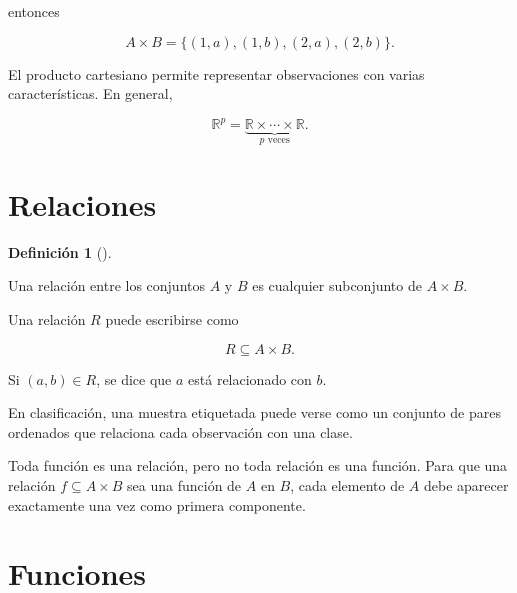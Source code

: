 \documentclass[
  spanish,
  10.5pt,
  letterpaper,
  DIV=11,
  numbers=noendperiod,
  oneside,
  open=any]{scrreprt}
\theoremstyle{definition}
\newtheorem{definition}{Definición}[chapter]
\theoremstyle{definition}
\theoremstyle{plain}
\theoremstyle{remark}
\begin{document}
entonces

\[
A\times B
=
\{(1,a),(1,b),(2,a),(2,b)\}.
\]

El producto cartesiano permite representar observaciones con varias
características. En general,

\[
\mathbb{R}^{p}
=
\underbrace{
\mathbb{R}\times\cdots\times\mathbb{R}
}_{p\text{ veces}}.
\]

\section*{Relaciones}\label{relaciones}


\begin{definition}[]\protect\hypertarget{def-relacion}{}\label{def-relacion}

Una relación entre los conjuntos \(A\) y \(B\) es cualquier subconjunto
de \(A\times B\).

\end{definition}

Una relación \(R\) puede escribirse como

\[
R\subseteq A\times B.
\]

Si \((a,b)\in R\), se dice que \(a\) está relacionado con \(b\).

En clasificación, una muestra etiquetada puede verse como un conjunto de
pares ordenados que relaciona cada observación con una clase.

\begin{tcolorbox}[enhanced jigsaw, arc=.35mm, bottomrule=.15mm, bottomtitle=1mm, breakable, colback=white, colbacktitle=quarto-callout-note-color!10!white, colframe=quarto-callout-note-color-frame, coltitle=black, left=2mm, leftrule=.75mm, opacityback=0, opacitybacktitle=0.6, rightrule=.15mm, title=\textcolor{quarto-callout-note-color}{\faInfo}\hspace{0.5em}{Relación y función}, titlerule=0mm, toprule=.15mm, toptitle=1mm]

Toda función es una relación, pero no toda relación es una función. Para
que una relación \(f\subseteq A\times B\) sea una función de \(A\) en
\(B\), cada elemento de \(A\) debe aparecer exactamente una vez como
primera componente.

\end{tcolorbox}

\section*{Funciones}\label{funciones}
\end{document}
